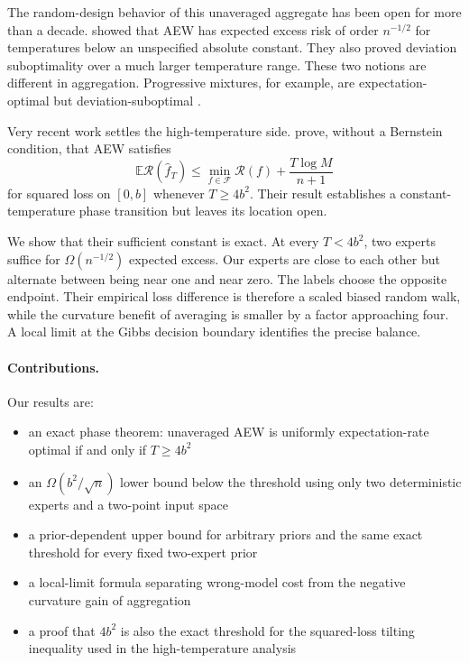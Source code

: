 \documentclass[twoside]{article}
\newcommand{\E}{\mathbb E}
\newcommand{\R}{\mathcal R}
\newcommand{\cF}{\mathcal F}
\newcommand{\1}{\mathbf 1}
\begin{document}
The random-design behavior of this unaveraged aggregate has been open for more than a decade. \citet{lecue2013optimality} showed that AEW has expected excess risk of order $n^{-1/2}$ for temperatures below an unspecified absolute constant. They also proved deviation suboptimality over a much larger temperature range. These two notions are different in aggregation. Progressive mixtures, for example, are expectation-optimal but deviation-suboptimal \citep{audibert2007progressive}.

Very recent work settles the high-temperature side. \citet{hogsgaard2026aggregation} prove, without a Bernstein condition, that AEW satisfies
\begin{equation}
\E\R(\widehat f_T)\leq \min_{f\in\cF}\R(f)+\frac{T\log M}{n+1}
\label{eq:upper}
\end{equation}
for squared loss on $[0,b]$ whenever $T\geq4b^2$. Their result establishes a constant-temperature phase transition but leaves its location open.

We show that their sufficient constant is exact. At every $T<4b^2$, two experts suffice for $\Omega(n^{-1/2})$ expected excess. Our experts are close to each other but alternate between being near one and near zero. The labels choose the opposite endpoint. Their empirical loss difference is therefore a scaled biased random walk, while the curvature benefit of averaging is smaller by a factor approaching four. A local limit at the Gibbs decision boundary identifies the precise balance.

\paragraph{Contributions.} Our results are:
\begin{itemize}
\item an exact phase theorem: unaveraged AEW is uniformly expectation-rate optimal if and only if $T\geq4b^2$
\item an $\Omega(b^2/\sqrt n)$ lower bound below the threshold using only two deterministic experts and a two-point input space
\item a prior-dependent upper bound for arbitrary priors and the same exact threshold for every fixed two-expert prior
\item a local-limit formula separating wrong-model cost from the negative curvature gain of aggregation
\item a proof that $4b^2$ is also the exact threshold for the squared-loss tilting inequality used in the high-temperature analysis
\end{itemize}
\end{document}
